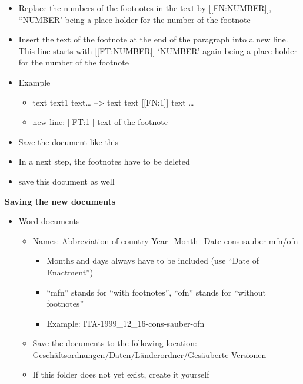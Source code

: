 \documentclass[10pt,]{article}
\providecommand{\tightlist}{%
  \setlength{\itemsep}{0pt}\setlength{\parskip}{0pt}}
\begin{document}
\begin{itemize}
\begin{itemize}
    \begin{itemize}
    \tightlist
    \item
      Replace the numbers of the footnotes in the text by
      {[}{[}FN:NUMBER{]}{]}, ``NUMBER' being a place holder for the
      number of the footnote
    \item
      Insert the text of the footnote at the end of the paragraph into a
      new line. This line starts with {[}{[}FT:NUMBER{]}{]} `NUMBER'
      again being a place holder for the number of the footnote
    \item
      Example

      \begin{itemize}
      \tightlist
      \item
        text text1 text\ldots{} --\textgreater{} text text
        {[}{[}FN:1{]}{]} text \ldots{}
      \item
        new line: {[}{[}FT:1{]}{]} text of the footnote
      \end{itemize}
    \item
      Save the document like this
    \item
      In a next step, the footnotes have to be deleted
    \item
      save this document as well
    \end{itemize}
  \end{itemize}
\end{itemize}

\textbf{Saving the new documents}

\begin{itemize}
\tightlist
\item
  Word documents

  \begin{itemize}
  \tightlist
  \item
    Names: Abbreviation of country-Year\_Month\_Date-cons-sauber-mfn/ofn

    \begin{itemize}
    \tightlist
    \item
      Months and days always have to be included (use ``Date of
      Enactment'')
    \item
      ``mfn'' stands for ``with footnotes'', ``ofn'' stands for
      ``without footnotes''
    \item
      Example: ITA-1999\_12\_16-cons-sauber-ofn
    \end{itemize}
  \item
    Save the documents to the following location:
    Geschäftsordnungen/Daten/Länderordner/Gesäuberte Versionen
  \item
    If this folder does not yet exist, create it yourself
  \end{itemize}
\end{itemize}
\end{document}
